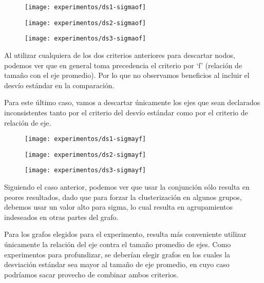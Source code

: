 \begin{figure}[H]
	\centering
	\begin{minipage}[t]{.3\textwidth}
		\centering
		\texttt{[image: experimentos/ds1-sigmaof]}
	\end{minipage}\qquad
	\begin{minipage}[t]{.3\textwidth}
		\centering
		\texttt{[image: experimentos/ds2-sigmaof]}
	\end{minipage}\qquad
	\begin{minipage}[t]{.3\textwidth}
		\centering
		\texttt{[image: experimentos/ds3-sigmaof]}
	\end{minipage}
\end{figure}

Al utilizar cualquiera de los dos criterios anteriores para descartar nodos, podemos ver que en general toma precedencia el criterio por ‘f’ (relación de tamaño con el eje promedio). Por lo que no observamos beneficios al incluir el desvío estándar en la comparación. 

Para este último caso, vamos a descartar únicamente los ejes que sean declarados inconsistentes tanto por el criterio del desvío estándar como por el criterio de relación de eje.

\begin{figure}[H]
	\centering
	\begin{minipage}[t]{.3\textwidth}
		\centering
		\texttt{[image: experimentos/ds1-sigmayf]}
	\end{minipage}\qquad
	\begin{minipage}[t]{.3\textwidth}
		\centering
		\texttt{[image: experimentos/ds2-sigmayf]}
	\end{minipage}\qquad
	\begin{minipage}[t]{.3\textwidth}
		\centering
		\texttt{[image: experimentos/ds3-sigmayf]}
	\end{minipage}
\end{figure}

Siguiendo el caso anterior, podemos ver que usar la conjunción sólo resulta en peores resultados, dado que para forzar la clusterización en algunos grupos, debemos usar un valor alto para sigma, lo cual resulta en agrupamientos indeseados en otras partes del grafo.


Para los grafos elegidos para el experimento, resulta más conveniente utilizar únicamente la relación del eje contra el tamaño promedio de ejes. Como experimentos para profundizar, se deberían elegir grafos en los cuales la desviación estándar sea mayor al tamaño de eje promedio, en cuyo caso podríamos sacar provecho de combinar ambos criterios.


